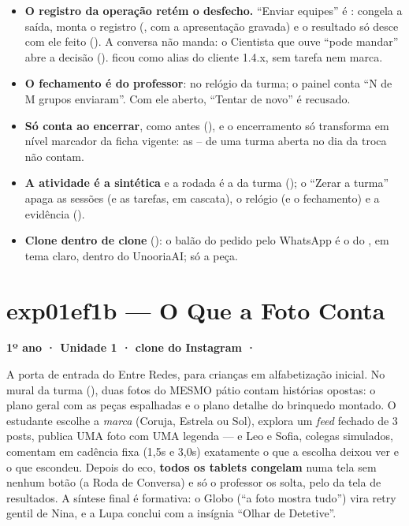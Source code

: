 \begin{itemize}
  \item \textbf{O registro da operação retém o desfecho.} \enquote{Enviar
    equipes} é : congela a saída, monta o registro
    (, com a apresentação gravada) e o resultado só
    desce com ele feito (). A conversa não manda: o
    Cientista que ouve \enquote{pode mandar} abre a decisão
    ().  ficou como alias do
    cliente 1.4.x, sem tarefa nem marca.
  \item \textbf{O fechamento é do professor}:  no relógio
    da turma; o painel conta \enquote{N de M grupos enviaram}. Com ele aberto,
    \enquote{Tentar de novo} é recusado.
  \item \textbf{Só conta ao encerrar}, como antes (),
    e o encerramento só transforma em nível marcador da ficha vigente: as
    -- de uma turma aberta no dia da troca não contam.
  \item \textbf{A atividade é a sintética } e a rodada é a da
    turma (); o \enquote{Zerar a turma} apaga as
    sessões (e as tarefas, em cascata), o relógio (e o fechamento) e a
    evidência ().
  \item \textbf{Clone dentro de clone} (): o balão do pedido pelo
    WhatsApp é o  do , em tema claro, dentro do
    UnooriaAI; só a peça.
\end{itemize}

\section{exp01ef1b --- O Que a Foto Conta}
\label{sec:exp01ef1b}

\textbf{1º ano · Unidade 1 · clone do Instagram · }

A porta de entrada do Entre Redes, para crianças em alfabetização inicial. No
mural da turma (), duas fotos do MESMO pátio contam histórias
opostas: o plano geral com as peças espalhadas e o plano detalhe do brinquedo
montado. O estudante escolhe a \emph{marca} (Coruja, Estrela ou Sol), explora
um \emph{feed} fechado de 3 posts, publica UMA foto com UMA legenda --- e Leo e
Sofia, colegas simulados, comentam em cadência fixa (1,5s e 3,0s) exatamente o
que a escolha deixou ver e o que escondeu. Depois do eco, \textbf{todos os
tablets congelam} numa tela sem nenhum botão (a Roda de Conversa) e só o
professor os solta, pelo  da tela de resultados. A
síntese final é formativa: o Globo (\enquote{a foto mostra tudo}) vira retry
gentil de Nina, e a Lupa conclui com a insígnia \enquote{Olhar de Detetive}.

